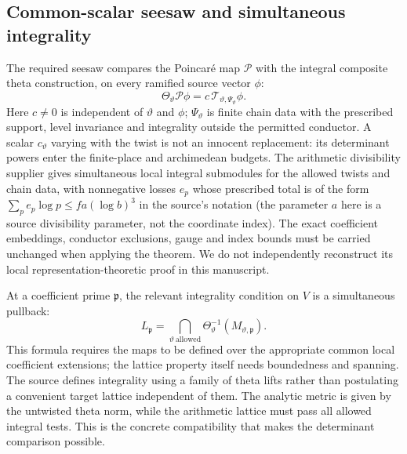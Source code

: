 \documentclass[11pt,a4paper]{article}
\begin{document}
\subsection{Common-scalar seesaw and simultaneous integrality}
The required seesaw compares the Poincar\'e map $\mathcal P$ with the integral composite theta construction, on every ramified source vector $\phi$:
\begin{equation}\label{eq:seesaw}
\Theta_\vartheta\mathcal P\phi=c\,\mathcal T_{\vartheta,\Psi_\vartheta}\phi.
\end{equation}
Here $c\ne0$ is independent of $\vartheta$ and $\phi$; $\Psi_\vartheta$ is finite chain data with the prescribed support, level invariance and integrality outside the permitted conductor. A scalar $c_\vartheta$ varying with the twist is not an innocent replacement: its determinant powers enter the finite-place and archimedean budgets. The arithmetic divisibility supplier gives simultaneous local integral submodules for the allowed twists and chain data, with nonnegative losses $e_p$ whose prescribed total is of the form $\sum_p e_p\log p\leq fa(\log b)^3$ in the source's notation (the parameter $a$ here is a source divisibility parameter, not the coordinate index). The exact coefficient embeddings, conductor exclusions, gauge and index bounds must be carried unchanged when applying the theorem. We do not independently reconstruct its local representation-theoretic proof in this manuscript.

At a coefficient prime $\mathfrak p$, the relevant integrality condition on $V$ is a simultaneous pullback:
\begin{equation}\label{eq:pullback}
L_{\mathfrak p}=\bigcap_{\vartheta\ \mathrm{allowed}}\Theta_\vartheta^{-1}(M_{\vartheta,\mathfrak p}).
\end{equation}
This formula requires the maps to be defined over the appropriate common local coefficient extensions; the lattice property itself needs boundedness and spanning. The source defines integrality using a family of theta lifts rather than postulating a convenient target lattice independent of them. The analytic metric is given by the untwisted theta norm, while the arithmetic lattice must pass all allowed integral tests. This is the concrete compatibility that makes the determinant comparison possible.
\end{document}
